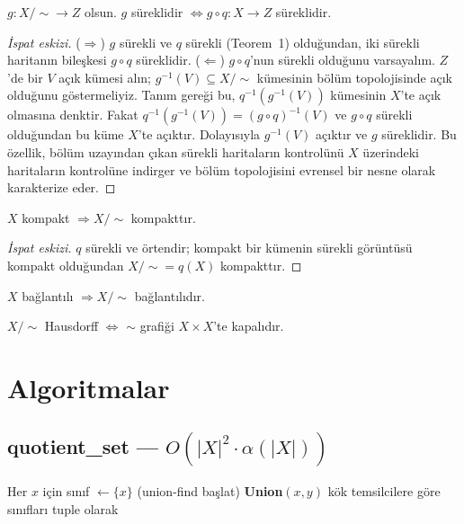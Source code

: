 \begin{theorem}
$g: X/{\sim} \to Z$ olsun.
$g$ süreklidir $\Longleftrightarrow g \circ q: X \to Z$ süreklidir.
\begin{proof}[İspat eskizi]
($\Rightarrow$) $g$ sürekli ve $q$ sürekli (Teorem~1) olduğundan, iki sürekli
haritanın bileşkesi $g \circ q$ süreklidir.
($\Leftarrow$) $g \circ q$'nun sürekli olduğunu varsayalım. $Z$'de bir $V$ açık
kümesi alın; $g^{-1}(V) \subseteq X/{\sim}$ kümesinin bölüm topolojisinde açık
olduğunu göstermeliyiz. Tanım gereği bu, $q^{-1}(g^{-1}(V))$ kümesinin $X$'te
açık olmasına denktir. Fakat
$q^{-1}(g^{-1}(V)) = (g \circ q)^{-1}(V)$ ve $g \circ q$ sürekli olduğundan bu
küme $X$'te açıktır. Dolayısıyla $g^{-1}(V)$ açıktır ve $g$ süreklidir. Bu
özellik, bölüm uzayından çıkan sürekli haritaların kontrolünü $X$ üzerindeki
haritaların kontrolüne indirger ve bölüm topolojisini evrensel bir nesne olarak
karakterize eder.
\end{proof}
\end{theorem}

\begin{theorem}
$X$ kompakt $\Rightarrow X/{\sim}$ kompakttır.
\begin{proof}[İspat eskizi]
$q$ sürekli ve örtendir; kompakt bir kümenin sürekli görüntüsü kompakt olduğundan
$X/{\sim} = q(X)$ kompakttır.
\end{proof}
\end{theorem}

\begin{theorem}
$X$ bağlantılı $\Rightarrow X/{\sim}$ bağlantılıdır.
\end{theorem}

\begin{theorem}
$X/{\sim}$ Hausdorff $\Longleftrightarrow$ $\sim$ grafiği $X \times X$'te kapalıdır.
\end{theorem}

\section{Algoritmalar}

\subsection{quotient\_set — $O(|X|^2 \cdot \alpha(|X|))$}

\begin{algorithm}
\caption{QuotientSet$(X, \sim)$}
\begin{algorithmic}[1]
\State Her $x$ için sınıf $\leftarrow \{x\}$ (union-find başlat)
    \State \textbf{Union}$(x, y)$
\EndFor
\State \Return kök temsilcilere göre sınıfları tuple olarak
\end{algorithmic}
\end{algorithm}

